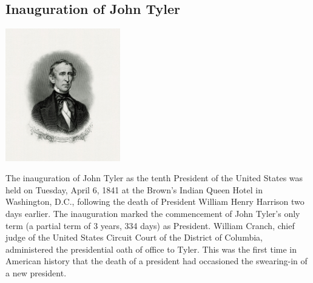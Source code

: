 \documentclass[11pt]{report}
\begin{document}
\subsection{Inauguration of John Tyler}
\vspace{2mm}\begin{center}\includegraphics[width=5cm]{./img/johnTyler.jpg}\end{center}
The inauguration of John Tyler as the tenth President of the United States was held on Tuesday, April 6, 1841 at the Brown’s Indian Queen Hotel in Washington, D.C., following the death of President William Henry Harrison two days earlier. The inauguration marked the commencement of John Tyler's only term (a partial term of 3 years, 334 days) as President. William Cranch, chief judge of the United States Circuit Court of the District of Columbia, administered the presidential oath of office to Tyler. This was the first time in American history that the death of a president had occasioned the swearing-in of a new president.

\section{}
\end{document}
